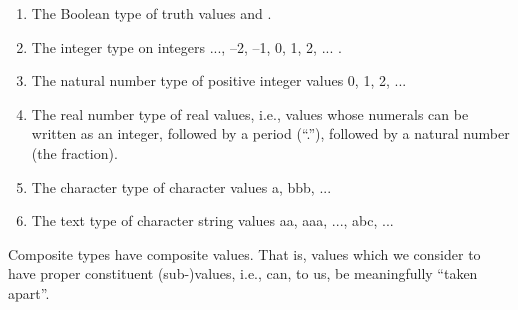 \begin{enumerate}
\item\label{tseb.rsl.1}
      The Boolean type of truth values  and .
\item\label{tseb.rsl.2}
      The integer type on integers ..., --2, --1, 0, 1, 2, ... .
\item\label{tseb.rsl.3}
      The natural number type of positive integer values 0, 1, 2, ...
\item\label{tseb.rsl.4}
      The real number type of real values, i.e., values whose numerals
  can be written as an integer, followed by a period (``.''), followed
  by a natural number (the fraction).
\item\label{tseb.rsl.5}
      The character type of character values
  \textsf{{\PRIM}{\PRIM}a{\PRIM}{\PRIM},
    {\PRIM}{\PRIM}bbb{\PRIM}{\PRIM}, ...} 
\item\label{tseb.rsl.6}
      The text type of character string values
    \textsf{{\PRIM}{\PRIM}aa{\PRIM}{\PRIM},
    {\PRIM}{\PRIM}aaa{\PRIM}{\PRIM}, ..., 
    {\PRIM}{\PRIM}abc{\PRIM}{\PRIM}, ...}
\savei\end{enumerate}

\label{Composite Types}
\hhhh{}\hhhh{} 

\begynd
\pind Composite types have composite values.
\pind That is, values which we consider to have proper constituent
      (sub-)values, 
\pind i.e., can, to us, be meaningfully ``taken apart''. 
\afslut


